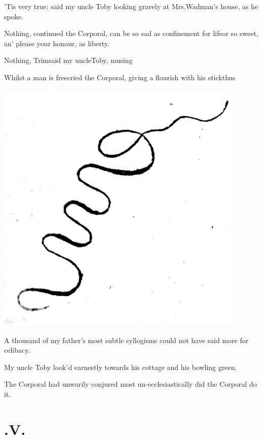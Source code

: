\documentclass{article}
\begin{document}
’Tis very true; said my uncle Toby looking gravely
at Mrs.\@ Wadman’s house, as he spoke.

Nothing, continued the Corporal, can be so sad as confinement
for life\tsk or so sweet, an’ please your honour, as
liberty.

Nothing, Trim\tsh said my uncle\break Toby, musing\tsh


Whilst a man is free\tsk cried the Corporal, giving a flourish with his
stick\break thus\tsh

\vfill
\centerline{\includegraphics[width=0.9\textwidth]{flourish.png}}
\vfill

\eject
\noindent
A thousand of my father’s most subtle syllogisms could not have said more
for celibacy.


My uncle Toby look’d earnestly towards his cottage
and his bowling green.

The Corporal had unwarily conjured
most un-ecclesiastically did the Corporal do it.

\vfill{}\eject
\section{.\enspace V.}
\end{document}
